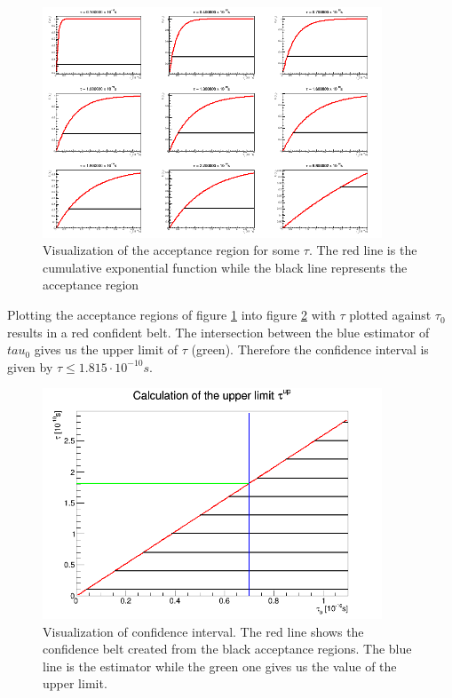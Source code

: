 \documentclass[10pt]{article}
\newenvironment{myfont}{\fontfamily{put}\selectfont}{\par}
\begin{document}
\begin{myfont}
\begin{figure}
    \centering
    \includegraphics[width=0.9\textwidth]{exercise12_1a.png}
    \caption{Visualization of the acceptance region for some $\tau$. The red line is the cumulative exponential function while the black line represents the acceptance region}
    \label{fig:accRegion}
\end{figure}

Plotting the acceptance regions of figure \ref{fig:accRegion} into figure \ref{fig:upperCI} with $\tau$ plotted against $\tau_0$ results in a red confident belt. The intersection between the blue estimator of $tau_0$ gives us the upper limit of $\tau$ (green). Therefore the confidence interval is given by $\tau \leq 1.815 \cdot 10^{-10} \si{s}$.  

\begin{figure}
    \centering
    \includegraphics[width=0.9\textwidth]{exercise12_1b.png}
    \caption{Visualization of confidence interval. The red line shows the confidence belt created from the black acceptance regions. The blue line is the estimator while the green one gives us the value of the upper limit.}
    \label{fig:upperCI}
\end{figure}


\end{myfont}
\end{document}
